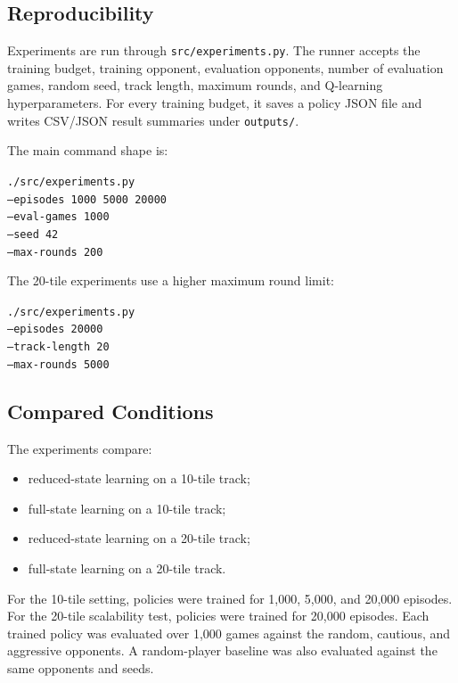 \documentclass[conference]{IEEEtran}
\begin{document}
\subsection{Reproducibility}

Experiments are run through \texttt{src/experiments.py}. The runner accepts the
training budget, training opponent, evaluation opponents, number of evaluation
games, random seed, track length, maximum rounds, and Q-learning hyperparameters.
For every training budget, it saves a policy JSON file and writes CSV/JSON result
summaries under \texttt{outputs/}.

The main command shape is:

\noindent\texttt{./src/experiments.py}\\
\texttt{--episodes 1000 5000 20000}\\
\texttt{--eval-games 1000}\\
\texttt{--seed 42}\\
\texttt{--max-rounds 200}

The 20-tile experiments use a higher maximum round limit:

\noindent\texttt{./src/experiments.py}\\
\texttt{--episodes 20000}\\
\texttt{--track-length 20}\\
\texttt{--max-rounds 5000}

\subsection{Compared Conditions}

The experiments compare:

\begin{itemize}
\item reduced-state learning on a 10-tile track;
\item full-state learning on a 10-tile track;
\item reduced-state learning on a 20-tile track;
\item full-state learning on a 20-tile track.
\end{itemize}

For the 10-tile setting, policies were trained for 1,000, 5,000, and 20,000
episodes. For the 20-tile scalability test, policies were trained for 20,000
episodes. Each trained policy was evaluated over 1,000 games against the random,
cautious, and aggressive opponents. A random-player baseline was also evaluated
against the same opponents and seeds.
\end{document}
